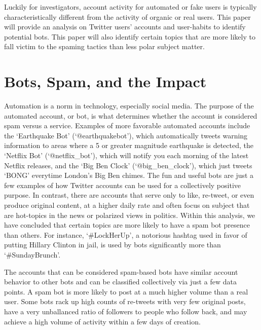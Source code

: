 Luckily for investigators, account activity for automated or fake users is typically characteristically different from the activity of organic or real users. This paper will provide an analysis on Twitter users' accounts and user-habits to identify potential bots. This paper will also identify certain topics that are more likely to fall victim to the spaming tactics than less polar subject matter.

\section{Bots, Spam, and the Impact}

Automation is a norm in technology, especially social media. The purpose of the automated account, or bot, is what determines whether the account is considered spam versus a service. Examples of more favorable automated accounts include the `Earthquake Bot' (`@earthquakebot'), which automatically tweets warning information to areas where a 5 or greater magnitude earthquake is detected, the `Netflix Bot' (`@netflix_bot'), which will notify you each morning of the latest Netflix releases, and the `Big Ben Clock' (`@big_ben_clock'), which just tweets `BONG' everytime London's Big Ben chimes. The fun and useful bots are just a few examples of how Twitter accounts can be used for a collectively positive purpose. In contrast, there are accounts that serve only to like, re-tweet, or even produce original content, at a higher daily rate and often focus on subject that are hot-topics in the news or polarized views in politics. Within this analysis, we have concluded that certain topics are more likely to have a spam bot presence than others. For instance, `#LockHerUp', a notorious hashtag used in favor of putting Hillary Clinton in jail, is used by bots significantly more than `#SundayBrunch'.

The accounts that can be considered spam-based bots have similar account behavior to other bots and can be classified collectively via just a few data points. A spam bot is more likely to post at a much higher volume than a real user. Some bots rack up high counts of re-tweets with very few original posts, have a very unballanced ratio of followers to people who follow back, and may achieve a high volume of activity within a few days of creation.

